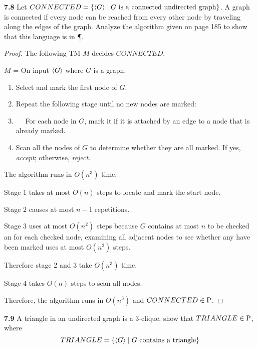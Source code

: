 \label{lang:CONNECTED_P}
\textbf{7.8} Let $CONNECTED = \{\desc{G} \mid \text{$G$ is a connected undirected graph} \}$. A graph is connected if every node can be reached from every other node by traveling along the edges of the graph. Analyze the algorithm given on page 185 to show that this language is in \P.
\begin{mdframed}
\begin{proof}
The following TM $M$ decides $CONNECTED$.

\medskip
$M$ = On input $\desc{G}$ where $G$ is a graph:
\begin{enumerate}
\item Select and mark the first node of $G$.
\item Repeat the following stage until no new nodes are marked:
\item $\quad$ For each node in $G$, mark it if it is attached by an edge to a node that is already marked.
\item Scan all the nodes of $G$ to determine whether they are all marked. If yes, \textit{accept}; otherwise, \textit{reject}.
\end{enumerate}

The algorithm runs in $O(n^3)$ time.

Stage 1 takes at most $O(n)$ steps to locate and mark the start node.

Stage 2 causes at most $n - 1$ repetitions.

Stage 3 uses at most $O(n^2)$ steps because $G$ contains at most $n$ to be checked an for each checked node, examining all adjacent nodes to see whether any have been marked uses at most $O(n^2)$ steps. 

Therefore stage 2 and 3 take $O(n^3)$ time.

Stage 4 takes $O(n)$ steps to scan all nodes.

Therefore, the algorithm runs in $O(n^3)$ and $CONNECTED \in \P$.
\end{proof}
\end{mdframed}

\label{lang:TRIANGLE_P}
\textbf{7.9} A triangle in an undirected graph is a 3-clique, show that $TRIANGLE \in \P$, where
\[
TRIANGLE = \{\desc{G} \mid \text{$G$ contains a triangle}\}
\]

